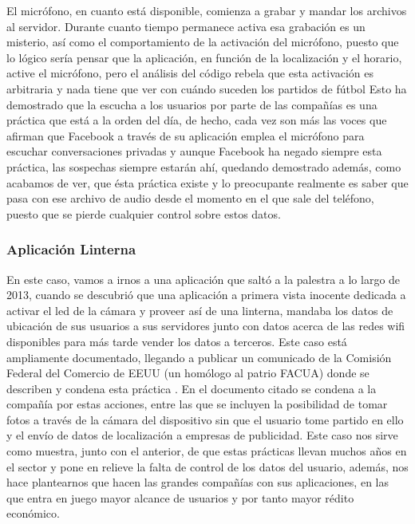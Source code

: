 \documentclass[12pt,a4paper,oneside]{book} %
\begin{document}
\newline \newline 
El micrófono, en cuanto está disponible, comienza a grabar y mandar los archivos al servidor. Durante cuanto tiempo permanece activa esa grabación es un misterio, así como el comportamiento de la activación del micrófono, puesto que lo lógico sería pensar que la aplicación, en función de la localización y el horario, active el micrófono, pero el análisis del código rebela que esta activación es arbitraria y nada tiene que ver con cuándo suceden los partidos de fútbol 
\newline \newline 
Esto ha demostrado que la escucha a los usuarios por parte de las compañías es una práctica que está a la orden del día, de hecho, cada vez son más las voces que afirman que Facebook a través de su aplicación emplea el micrófono para escuchar conversaciones privadas y aunque Facebook ha negado siempre esta práctica, las sospechas siempre estarán ahí, quedando demostrado además, como acabamos de ver, que ésta práctica existe y lo preocupante realmente es saber que pasa con ese archivo de audio desde el momento en el que sale del teléfono, puesto que se pierde cualquier control sobre estos datos. 
\subsubsection{Aplicación Linterna}
En este caso, vamos a irnos a una aplicación que saltó a la palestra a lo largo de 2013, cuando se descubrió que una aplicación a primera vista inocente dedicada a activar el led de la cámara y proveer así de una linterna, mandaba los datos de ubicación de sus usuarios a sus servidores junto con datos acerca de las redes wifi disponibles para más tarde vender los datos a terceros. 
\newline \newline 
Este caso está ampliamente documentado, llegando a publicar un comunicado de la Comisión Federal del Comercio de EEUU (un homólogo al patrio FACUA) donde se describen y condena esta práctica \cite{CFCEEUU}. 
\newline \newline 
En el documento citado se condena a la compañía por estas acciones, entre las que se incluyen la posibilidad de tomar fotos a través de la cámara del dispositivo sin que el usuario tome partido en ello y el envío de datos de localización a empresas de publicidad. 
\newline \newline 
Este caso nos sirve como muestra, junto con el anterior, de que estas prácticas llevan muchos años en el sector y pone en relieve la falta de control de los datos del usuario, además, nos hace plantearnos que hacen las grandes compañías con sus aplicaciones, en las que entra en juego mayor alcance de usuarios y por tanto mayor rédito económico. 
\end{document}
